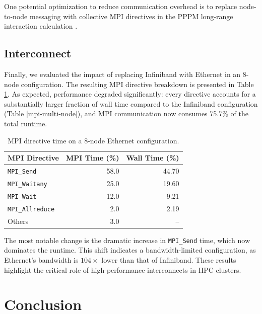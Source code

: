 \documentclass[sigplan, nonacm, screen]{acmart}
\begin{document}
One potential optimization to reduce communication overhead is to replace node-to-node messaging
with collective MPI directives in the PPPM long-range interaction calculation \cite{kspace-modify}.

\subsection{Interconnect} %
\label{profiling-interconnect}

Finally, we evaluated the impact of replacing Infiniband with Ethernet in an 8-node configuration.
The resulting MPI directive breakdown is presented in Table \ref{mpi-multi-node-ethernet}. As
expected, performance degraded significantly: every directive accounts for a substantially larger
fraction of wall time compared to the Infiniband configuration (Table \ref{mpi-multi-node}), and MPI
communication now consumes 75.7\% of the total runtime.

\begin{table}[h]
    \caption{MPI directive time on a $8$-node Ethernet configuration.}
    \label{mpi-multi-node-ethernet}

    \begin{tabular}{lrr}
        \toprule
        MPI Directive           & MPI Time (\%) & Wall Time (\%) \\
        \midrule
        \texttt{MPI\_Send}      &          58.0 &          44.70 \\
        \texttt{MPI\_Waitany}   &          25.0 &          19.60 \\
        \texttt{MPI\_Wait}      &          12.0 &           9.21 \\
        \texttt{MPI\_Allreduce} &           2.0 &           2.19 \\
        Others                  &           3.0 &             -- \\
        \bottomrule
    \end{tabular}
\end{table}

The most notable change is the dramatic increase in \texttt{MPI\_Send} time, which now dominates the
runtime. This shift indicates a bandwidth-limited configuration, as Ethernet's bandwidth is
$104\times$ lower than that of Infiniband. These results highlight the critical role of
high-performance interconnects in HPC clusters.

\section{Conclusion} %
\label{conclusion}
\end{document}

